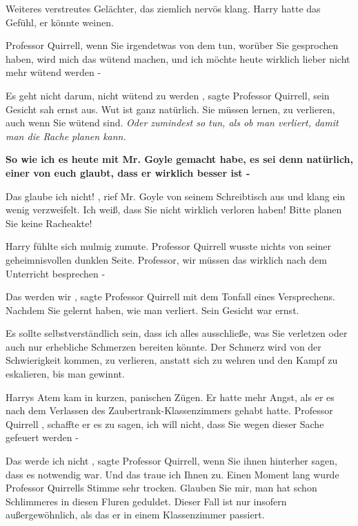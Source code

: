 Weiteres verstreutes Gelächter, das ziemlich nervös klang. Harry hatte das
Gefühl, er könnte weinen.

\glqq Professor Quirrell, wenn Sie irgendetwas von dem tun, worüber Sie
gesprochen haben, wird mich das wütend machen, und ich möchte heute wirklich
lieber nicht mehr wütend werden -\grqq{}

\glqq Es geht nicht darum, nicht wütend zu werden\grqq{} , sagte Professor
Quirrell, sein Gesicht sah ernst aus. \glqq Wut ist ganz natürlich. Sie müssen
lernen, zu verlieren, auch wenn Sie wütend sind. \emph{Oder zumindest so tun,
als ob man verliert, damit man die Rache planen kann.}

\textbf{So wie ich es heute mit Mr. Goyle gemacht habe, es sei denn natürlich,
einer von euch glaubt, dass er wirklich besser ist -\grqq{} }

\glqq Das glaube ich nicht!\grqq{} , rief Mr. Goyle von seinem Schreibtisch aus
und klang ein wenig verzweifelt. \glqq Ich weiß, dass Sie nicht wirklich
verloren haben! Bitte planen Sie keine Racheakte!\grqq{}

Harry fühlte sich mulmig zumute. Professor Quirrell wusste nichts von seiner
geheimnisvollen dunklen Seite. \glqq Professor, wir müssen das wirklich nach dem
Unterricht besprechen -\grqq{}

\glqq Das werden wir\grqq{} , sagte Professor Quirrell mit dem Tonfall eines
Versprechens. \glqq Nachdem Sie gelernt haben, wie man verliert.\grqq{} Sein
Gesicht war ernst.

\glqq Es sollte selbstverständlich sein, dass ich alles ausschließe, was Sie
verletzen oder auch nur erhebliche Schmerzen bereiten könnte. Der Schmerz wird
von der Schwierigkeit kommen, zu verlieren, anstatt sich zu wehren und den Kampf
zu eskalieren, bis man gewinnt.\grqq{}

Harrys Atem kam in kurzen, panischen Zügen. Er hatte mehr Angst, als er es nach
dem Verlassen des Zaubertrank-Klassenzimmers gehabt hatte. \glqq Professor
Quirrell\grqq{} , schaffte er es zu sagen, \glqq ich will nicht, dass Sie wegen
dieser Sache gefeuert werden -\grqq{}

\glqq Das werde ich nicht\grqq{} , sagte Professor Quirrell, \glqq wenn Sie
ihnen hinterher sagen, dass es notwendig war. Und das traue ich Ihnen zu.\grqq{}
Einen Moment lang wurde Professor Quirrells Stimme sehr trocken. \glqq Glauben
Sie mir, man hat schon Schlimmeres in diesen Fluren geduldet. Dieser Fall ist
nur insofern außergewöhnlich, als das er in einem Klassenzimmer passiert.\grqq{}

